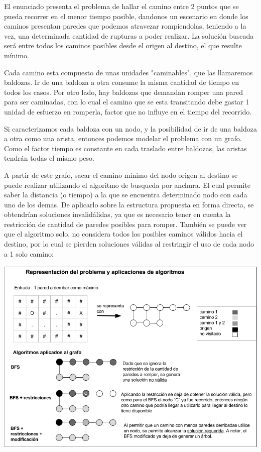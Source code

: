 El enunciado presenta el problema de hallar el camino entre 2 puntos que se pueda recorrer en el menor tiempo posible, dandonos un escenario en donde los caminos presentan paredes que podemos atravezar rompiendolas, teniendo a la vez, una determinada cantidad de rupturas a poder realizar. La solución buscada será entre todos los caminos posibles desde el origen al destino, el que resulte mínimo.

Cada camino esta compuesto de unas unidades "caminables", que las llamaremos baldozas. Ir de una baldoza a otra consume la misma cantidad de tiempo en todos los casos. Por otro lado, hay 
baldozas que demandan romper una pared para ser caminadas, con lo cual el camino que se esta transitando debe gastar 1 unidad de esfuerzo en romperla, factor que no influye en el tiempo del recorrido.

Si caracterizamos cada baldoza con un nodo, y la posibilidad de ir de una baldoza a otra como una arista, entonces podemos modelar el problema con un grafo. Como el factor tiempo es constante en cada traslado entre baldozas, las aristas tendrán todas el mismo peso.

A partir de este grafo, sacar el camino mínimo del nodo origen al destino se puede realizar utilizando el algoritmo de busqueda por anchura. El cual permite saber la distancia (o tiempo) a la que se encuentra determinado nodo con cada uno de los demas. De aplicarlo sobre la estructura propuesta en forma directa, se obtendrían soluciones invalidálidas, ya que es necesario tener en cuenta la restricción de cantidad de paredes posibles para romper. También se puede ver que el algoritmo solo, no considera todos los posibles caminos válidos hacia el destino, por lo cual se pierden soluciones v\'alidas al restringir el uso de cada nodo a 1 solo camino:

  \vspace*{0.3cm} \vspace*{0.3cm}
  \begin{center}
 \includegraphics[scale=0.6]{./EJ1/ej1-explicacion.png}
  \end{center}
  \vspace*{0.3cm}

